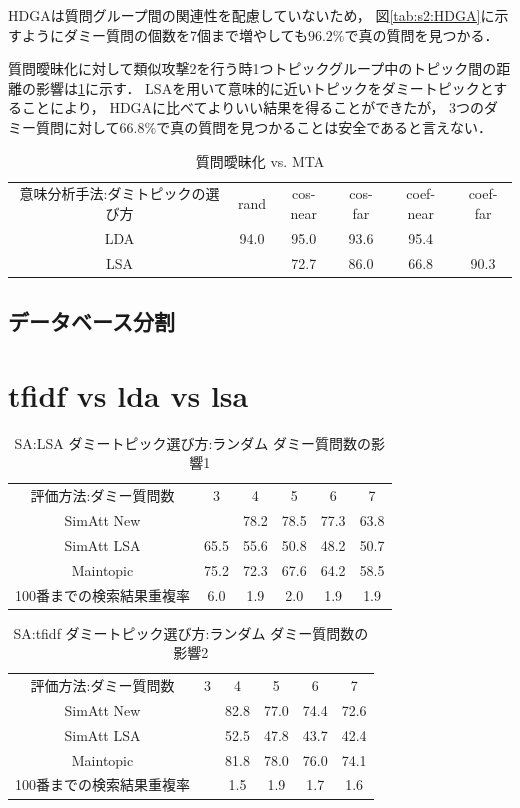\documentclass[master]{suribt}
\theoremstyle{definition}
\begin{document}
 HDGAは質問グループ間の関連性を配慮していないため，
 図\ref{tab:s2:HDGA}に示すようにダミー質問の個数を7個まで増やしても$96.2\%$で真の質問を見つかる．

 質問曖昧化に対して類似攻撃2を行う時1つトピックグループ中のトピック間の距離の影響は\ref{tab:mt:AAAA}に示す．
 LSAを用いて意味的に近いトピックをダミートピックとすることにより，
 HDGAに比べてよりいい結果を得ることができたが，
 3つのダミー質問に対して$66.8\%$で真の質問を見つかることは安全であると言えない．

 \begin{table}[!hbp]
 \center
 \begin{tabular}{|c|c|c|c|c|c|}
 \hline
 意味分析手法:ダミトピックの選び方 & rand & cos-near & cos-far & coef-near & coef-far \\
 LDA & 94.0 & 95.0  & 93.6  & 95.4 & \\
 LSA &  & 72.7 & 86.0 & 66.8 & 90.3 \\
 \hline
 \end{tabular}
 \caption{質問曖昧化 vs. MTA}
 \label{tab:mt:AAAA}
 \end{table}

 \subsection{データベース分割}

 
 

 \section{tfidf vs lda vs lsa}
 \begin{table}[!hbp]
 \center
 \begin{tabular}{|c|c|c|c|c|c|}
 \hline
 評価方法:ダミー質問数  & 3 & 4 & 5 & 6 & 7    \\
 SimAtt New &  & 78.2 & 78.5 & 77.3 & 63.8 \\
 SimAtt LSA & 65.5 &55.6 & 50.8 & 48.2 & 50.7 \\
 Maintopic & 75.2 & 72.3 & 67.6 & 64.2 & 58.5 \\
 100番までの検索結果重複率 & 6.0 & 1.9 & 2.0 & 1.9 & 1.9 \\
 \hline
 \end{tabular}
 \caption{SA:LSA ダミートピック選び方:ランダム ダミー質問数の影響1}
 \end{table}

 \begin{table}[!hbp]
 \center
 \begin{tabular}{|c|c|c|c|c|c|}
 \hline
 評価方法:ダミー質問数  & 3 & 4 & 5 & 6 & 7    \\
 SimAtt New &  & 82.8 & 77.0 & 74.4 & 72.6 \\
 SimAtt LSA &  & 52.5 & 47.8 & 43.7 & 42.4 \\
 Maintopic &  & 81.8 & 78.0 & 76.0 & 74.1 \\
 100番までの検索結果重複率 &  & 1.5 & 1.9 & 1.7 & 1.6 \\
 \hline
 \end{tabular}
 \caption{SA:tfidf ダミートピック選び方:ランダム ダミー質問数の影響2}
 \end{table}
\end{document}

